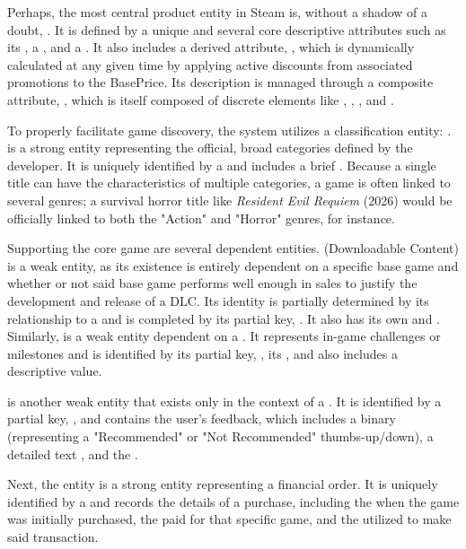 Perhaps, the most central product entity in Steam is, without a shadow of a doubt, . It is defined by a unique  and several core descriptive attributes such as its , a , and a . It also includes a derived attribute, , which is dynamically calculated at any given time by applying active discounts from associated promotions to the BasePrice. Its description is managed through a composite attribute, , which is itself composed of discrete elements like , , , and .

To properly facilitate game discovery, the system utilizes a classification entity: .  is a strong entity representing the official, broad categories defined by the developer. It is uniquely identified by a  and includes a brief . Because a single title can have the characteristics of multiple categories, a game is often linked to several genres; a survival horror title like \textit{Resident Evil Requiem} (2026) would be officially linked to both the "Action" and "Horror" genres, for instance.

Supporting the core game are several dependent entities.  (Downloadable Content) is a weak entity, as its existence is entirely dependent on a specific base game and whether or not said base game performs well enough in sales to justify the development and release of a DLC. Its identity is partially determined by its relationship to a  and is completed by its partial key, . It also has its own  and . Similarly,  is a weak entity dependent on a . It represents in-game challenges or milestones and is identified by its partial key, , its , and also includes a descriptive  value.

 is another weak entity that exists only in the context of a . It is identified by a partial key, , and contains the user's feedback, which includes a binary  (representing a "Recommended" or "Not Recommended" thumbs-up/down), a detailed text , and the .

Next, the  entity is a strong entity representing a financial order. It is uniquely identified by a  and records the details of a purchase, including the  when the game was initially purchased, the  paid for that specific game, and the  utilized to make said transaction.

